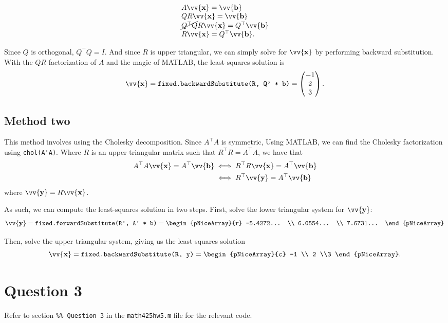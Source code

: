 \documentclass[12pt]{article}
\newcommand{\vect}[1]{\vv{\mathbf{#1}}}
\newcommand{\code}[1]{\texttt{#1}}
\begin{document}
$$
\begin{array}{ll}
A\vect{x} = \vect{b} \\
QR\vect{x} = \vect{b} \\
\cancel{Q^\top Q}R\vect{x} = Q^\top\vect{b}  \\
R\vect{x} = Q^\top\vect{b}.
\end{array}
$$

Since $Q$ is orthogonal, $Q^\top Q=I$. And since $R$ is upper triangular, we can simply solve for $\vect{x}$ by performing backward substitution. With the $QR$ factorization of $A$ and the magic of MATLAB, the least-squares solution is
$$
\vect{x} = \code{fixed.backwardSubstitute(R, Q' * b)} = \begin{pmatrix}
    -1 \\ 2 \\ 3
\end{pmatrix}.
$$

\subsection*{Method two}

This method involves using the Cholesky decomposition. Since $A^\top A$ is symmetric, Using MATLAB, we can find the Cholesky factorization using \verb|chol(A'A)|. Where $R$ is  an upper triangular matrix such that $R^\top R = A^\top A$, we have that
\begin{align*}
    A^\top A\vect{x} = A^\top\vect{b} &\iff R^\top R\vect{x} = A^\top\vect{b} \\
    &\iff R^\top\vect{y} = A^\top\vect{b}
\end{align*}
where $\vect{y} = R\vect{x}$.

As such, we can compute the least-squares solution in two steps. First, solve the lower triangular system for $\vect{y}$:
$$
\vect{y} = \code{fixed.forwardSubstitute(R', A' * b)} = \begin{pNiceArray}{r}
    -5.4272... \\
    6.0554... \\
    7.6731...
\end{pNiceArray}
$$

Then, solve the upper triangular system, giving us the least-squares solution
$$
\vect{x} = \code{fixed.backwardSubstitute(R, y)} = \begin{pNiceArray}{c}
    -1 \\ 2 \\3
\end{pNiceArray}.
$$

\section*{Question 3}

Refer to section \code{\%\% Question 3} in the \code{math425hw5.m} file for the relevant code.
\end{document}
